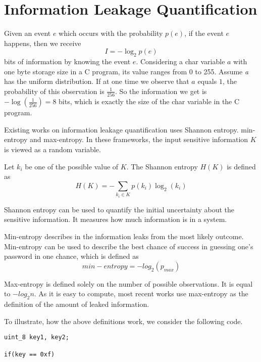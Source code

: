 
\section{Information Leakage Quantification}
 


Given an event $e$ which occurs with the probability $p(e)$, if the event $e$ happens, 
then we receive
\begin{displaymath}
    I = - \log_2p(e)
\end{displaymath}
bits of information by knowing the event $e$.
Considering a char variable $a$ with one byte storage size in a C program, its value 
ranges from 0 to 255.  Assume
 \textit{a} has the uniform distribution. If at one time we observe that $a$
equals $1$, the probability of this observation is $\frac{1}{256}$. So the information we get is 
$-\log(\frac{1}{256}) = 8$ bits, which is exactly the size of the char variable in the C program.

Existing works on information leakage quantification uses Shannon entropy.
min-entropy \cite{10.1007/978-3-642-00596-1_21} and max-entropy.
In these frameworks, the input sensitive
information $K$ is viewed as a random variable. 

Let $k_i$ be one of the possible
value of $K$. The Shannon entropy $H(K)$ is defined as
\begin{displaymath}
    H(K) = - \sum_{k_i {\in} K}p(k_i)\log_2(k_i)
\end{displaymath}

Shannon entropy can be used to quantify the initial uncertainty about the sensitive
information. It measures how much information is in a system.

Min-entropy describes in the information leaks from the most likely outcome.
Min-entropy can be used to describe the best chance of success in guessing 
one's password in one chance, which is defined as 
\begin{displaymath}
    min-entropy = - log_2(p_{max})
\end{displaymath}

Max-entropy is defined solely on the number of possible observations. It is 
equal to $-log_2{n}$. As it is easy to compute, most recent works use 
max-entropy as the definition of the amount of leaked information.

To illustrate, how the above definitions work, we consider the following
code. 

\begin{lstlisting}[xleftmargin=.03\textwidth,xrightmargin=.01\textwidth]
uint_8 key1, key2;

if(key == 0xf)

\end{lstlisting}


